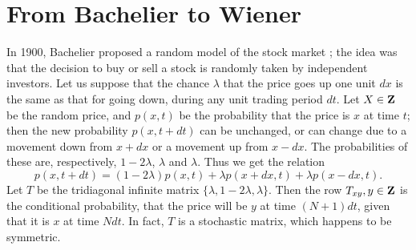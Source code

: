 \section{From Bachelier to Wiener}
In 1900, Bachelier proposed a random model of the stock market
\cite{Bachelier};
the idea was that the decision to buy or sell a stock is randomly
taken by independent investors. Let us suppose that the chance $\lambda$
that the price goes up one unit $dx$ is the same as that for going down,
during any unit trading period $dt$. Let $X\in{\bf Z}$ be the random price,
and $p(x,t)$
be the probability that the price is $x$ at time $t$; then the
new probability $p(x,t+dt)$ can be unchanged, or can change due to
a movement down from $x+dx$ or a movement up from $x-dx$. The probabilities
of these are, respectively, $1-2\lambda$, $\lambda$ and $\lambda$. Thus we
get the relation
\begin{equation}
p(x,t+dt)=(1-2\lambda)p(x,t)+\lambda p(x+dx,t)+\lambda p(x-dx,t).
\label{Bachelier}
\end{equation}
Let $T$ be the tridiagonal infinite matrix $\{\lambda,1-2\lambda,\lambda\}$.
Then the row $T_{xy},y\in{\bf Z}$ is the conditional probability, that the
price will be $y$ at time $(N+1)dt$, given that it is $x$ at time $Ndt$.
In fact, $T$ is a stochastic matrix, which happens to be symmetric.

